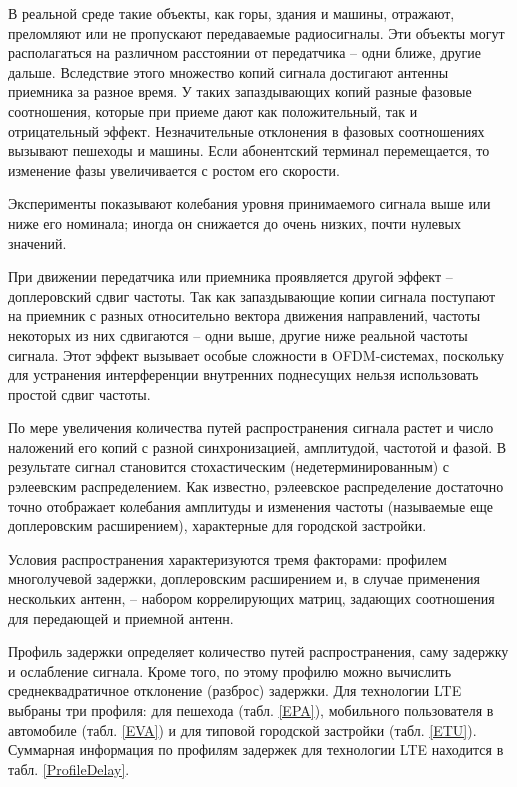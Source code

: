 В реальной среде такие объекты, как горы, здания и машины, отражают, преломляют или не пропускают передаваемые радиосигналы. Эти объекты могут располагаться на различном расстоянии от передатчика – одни ближе, другие дальше. Вследствие этого множество копий сигнала достигают антенны приемника за разное время. У таких запаздывающих копий разные фазовые соотношения, которые при приеме дают как положительный, так и отрицательный эффект. Незначительные отклонения в фазовых соотношениях вызывают пешеходы и машины. Если абонентский терминал перемещается, то изменение фазы увеличивается с ростом его скорости.

Эксперименты показывают колебания уровня принимаемого сигнала выше или ниже его номинала; иногда он снижается до очень низких, почти нулевых значений.

При движении передатчика или приемника проявляется другой эффект – доплеровский сдвиг частоты. Так как запаздывающие копии сигнала поступают на приемник с разных относительно вектора движения направлений, частоты некоторых из них сдвигаются – одни выше, другие ниже реальной частоты сигнала. Этот эффект вызывает особые сложности в OFDM-системах, поскольку для устранения интерференции внутренних поднесущих нельзя использовать простой сдвиг частоты.

По мере увеличения количества путей распространения сигнала растет и число наложений его копий с разной синхронизацией, амплитудой, частотой и фазой. В результате сигнал становится стохастическим (недетерминированным) с рэлеевским распределением. Как известно, рэлеевское распределение достаточно точно отображает колебания амплитуды и изменения частоты (называемые еще доплеровским расширением), характерные для городской застройки.

Условия распространения характеризуются тремя факторами: профилем многолучевой задержки, доплеровским расширением и, в случае применения нескольких антенн, – набором коррелирующих матриц, задающих соотношения для передающей и приемной антенн.

Профиль задержки определяет количество путей распространения, саму задержку и ослабление сигнала. Кроме того, по этому профилю можно вычислить среднеквадратичное отклонение (разброс) задержки. Для технологии LTE выбраны три профиля: для пешехода (табл. \ref{EPA}), мобильного пользователя в автомобиле (табл. \ref{EVA}) и для типовой городской застройки (табл. \ref{ETU}). Суммарная информация по профилям задержек для технологии LTE находится в табл. \ref{ProfileDelay}.

